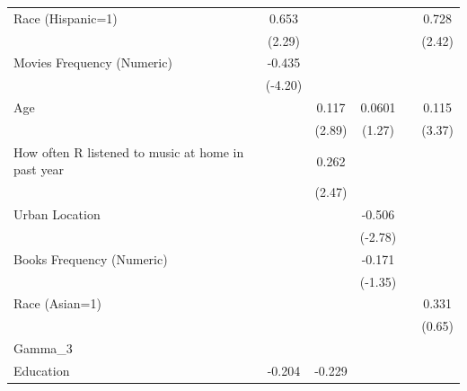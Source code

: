 {\begin{longtable}{l*{5}{c}}
Race (Hispanic=1)   &       0.653\sym{*}&                   &                   &                   &       0.728\sym{*}\\
                    &      (2.29)       &                   &                   &                   &      (2.42)       \\
Movies Frequency (Numeric)&      -0.435\sym{*}&                   &                   &                   &                   \\
                    &     (-4.20)       &                   &                   &                   &                   \\
Age                 &                   &       0.117\sym{*}&      0.0601       &                   &       0.115\sym{*}\\
                    &                   &      (2.89)       &      (1.27)       &                   &      (3.37)       \\
How often R listened to music at home in past year&                   &       0.262\sym{*}&                   &                   &                   \\
                    &                   &      (2.47)       &                   &                   &                   \\
Urban Location      &                   &                   &      -0.506\sym{*}&                   &                   \\
                    &                   &                   &     (-2.78)       &                   &                   \\
Books Frequency (Numeric)&                   &                   &      -0.171       &                   &                   \\
                    &                   &                   &     (-1.35)       &                   &                   \\
Race (Asian=1)      &                   &                   &                   &                   &       0.331       \\
                    &                   &                   &                   &                   &      (0.65)       \\
\midrule
Gamma\_3             &                   &                   &                   &                   &                   \\
Education           &      -0.204\sym{*}&      -0.229\sym{*}&                   &                   &                   \\

\end{longtable}}
